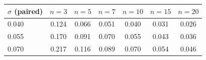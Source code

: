 \begin{tabular}{lcccccc}
\toprule
$\sigma$ (paired) & $n=3$ & $n=5$ & $n=7$ & $n=10$ & $n=15$ & $n=20$ \\
\midrule
0.040 & 0.124 & 0.066 & 0.051 & 0.040 & 0.031 & 0.026 \\
0.055 & 0.170 & 0.091 & 0.070 & 0.055 & 0.043 & 0.036 \\
0.070 & 0.217 & 0.116 & 0.089 & 0.070 & 0.054 & 0.046 \\
\bottomrule
\end{tabular}

